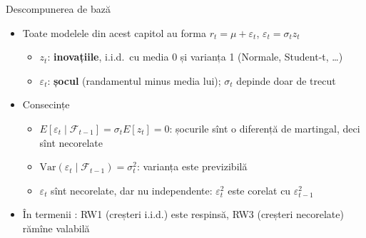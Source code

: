 \begin{frame}{Descompunerea de bază}
\itemsize{\small}
\begin{itemize}
    \item Toate modelele din acest capitol au forma $r_t = \mu + \varepsilon_t$, \quad $\varepsilon_t = \sigma_t z_t$
    \begin{itemize}
        \item $z_t$: \textbf{inovațiile}, i.i.d.\ cu media 0 și varianța 1 (Normale, Student-t, \dots)
        \item $\varepsilon_t$: \textbf{șocul} (randamentul minus media lui); $\sigma_t$ depinde doar de trecut
    \end{itemize}
    \item Consecințe
    \begin{itemize}
        \item $E[\varepsilon_t \mid \mathcal{F}_{t-1}] = \sigma_t E[z_t] = 0$: șocurile sînt o diferență de martingal, deci sînt necorelate
        \item $\mathrm{Var}(\varepsilon_t \mid \mathcal{F}_{t-1}) = \sigma_t^2$: varianța este previzibilă
        \item $\varepsilon_t$ sînt necorelate, dar nu independente: $\varepsilon_t^2$ este corelat cu $\varepsilon_{t-1}^2$
    \end{itemize}
    \item În termenii : RW1 (creșteri i.i.d.) este respinsă, RW3 (creșteri necorelate) rămîne valabilă
\end{itemize}
\end{frame}

